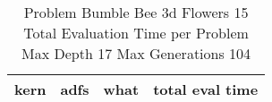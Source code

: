 \begin{table}[H]
\caption{Problem  Bumble Bee 3d  Flowers 15\\Total Evaluation Time per Problem \\ Max Depth 17 Max Generations 104\\}
\begin{center}
\scalebox{1.0} %
{
\begin{tabular}{lllr}
\hline
kern & adfs & what & total eval time \\
\hline


\end{tabular}
}
\end{center}
\end{table}

